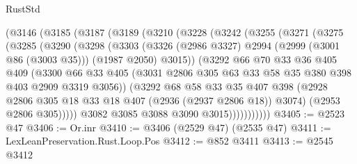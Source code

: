 \begin{lexlean}{RustStd}
\begin{coremodule}
    (@3146
      (@3185
        (@3187
          (@3189
            (@3210
              (@3228
                (@3242
                  (@3255
                    (@3271
                      (@3275
                        (@3285
                          (@3290
                            (@3298
                              (@3303
                                (@3326
                                  (@2986 @3327)
                                  @2994
                                  (@2999 (@3001 @86 (@3003 @35)))
                                  (@1987 @2050)
                                  @3015))
                              (@3292
                                @66
                                @70
                                @33
                                @36
                                @405
                                @409
                                (@3300
                                  @66
                                  @33
                                  @405
                                  (@3031
                                    @2806
                                    @305
                                    @63
                                    @33
                                    @58
                                    @35
                                    @380
                                    @398
                                    @403
                                    @2909
                                    @3319
                                    @3056))
                                (@3292
                                  @68
                                  @58
                                  @33
                                  @35
                                  @407
                                  @398
                                  (@2928
                                    @2806
                                    @305
                                    @18
                                    @33
                                    @18
                                    @407
                                    (@2936 (@2937 @2806 @18))
                                    @3074)
                                  (@2953 @2806 @305)))))
                          @3082
                          @3085
                          @3088
                          @3090
                          @3015)))))))))))
@3405 := @2523 @47
@3406 := Or.inr
@3410 := @3406 (@2529 @47) (@2535 @47)
@3411 := LexLeanPreservation.Rust.Loop.Pos
@3412 := @852 @3411
@3413 := @2545 @3412

\end{coremodule}
\end{lexlean}
